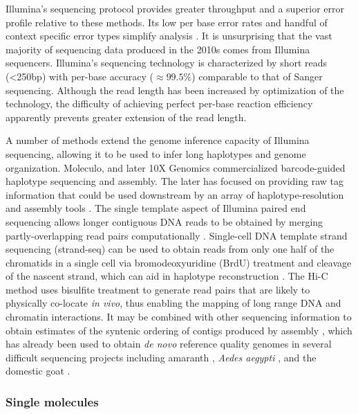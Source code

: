 Illumina's sequencing protocol provides greater throughput and a superior error profile relative to these methods.
Its low per base error rates and handful of context specific error types simplify analysis \cite{allhoff2013discovering}.
It is unsurprising that the vast majority of sequencing data produced in the 2010s comes from Illumina sequencers.
Illumina's sequencing technology is characterized by short reads (<250bp) with per-base accuracy ($\approx 99.5\%$) comparable to that of Sanger sequencing.
Although the read length has been increased by optimization of the technology, the difficulty of achieving perfect per-base reaction efficiency apparently prevents greater extension of the read length.

A number of methods extend the genome inference capacity of Illumina sequencing, allowing it to be used to infer long haplotypes and genome organization.
Moleculo, and later 10X Genomics commercialized barcode-guided haplotype sequencing and assembly.
The later has focused on providing raw tag information that could be used downstream by an array of haplotype-resolution and assembly tools \cite{mostovoy2016hybrid}.
The single template aspect of Illumina paired end sequencing allows longer contiguous DNA reads to be obtained by merging partly-overlapping read pairs computationally \cite{magovc2011flash}.
Single-cell DNA template strand sequencing (strand-seq) can be used to obtain reads from only one half of the chromatids in a single cell \cite{falconer2012dna} via bromodeoxyuridine (BrdU) treatment and cleavage of the nascent strand, which can aid in haplotype reconstruction \cite{porubsky2016direct}.
The Hi-C method \cite{lieberman2009comprehensive} uses bisulfite treatment to generate read pairs that are likely to physically co-locate \emph{in vivo}, thus enabling the mapping of long range DNA and chromatin interactions.
It may be combined with other sequencing information to obtain estimates of the syntenic ordering of contigs produced by assembly \cite{ghurye2018integrating}, which has already been used to obtain \emph{de novo} reference quality genomes in several difficult sequencing projects including amaranth \cite{lightfoot2017single}, \emph{Aedes aegypti} \cite{dudchenko2017novo}, and the domestic goat \cite{bickhart2017single}.

\subsubsection{Single molecules}

